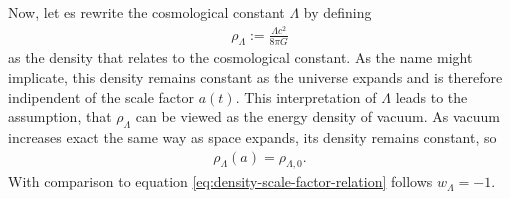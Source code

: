 \noindent Now, let es rewrite the cosmological constant $\Lambda$ by defining
\begin{align}
    \rho_{\Lambda} := \frac{\Lambda c^2}{8\pi G}
\end{align}
as the density that relates to the cosmological constant. As the name might implicate, this density remains constant as the universe expands and is therefore indipendent of the scale factor $a(t)$.
This interpretation of $\Lambda$ leads to the assumption, that $\rho_{\Lambda}$ can be viewed as the energy density of vacuum. As vacuum increases exact the same way as space expands, its density remains constant, so
\begin{align}
    \rho_{\Lambda}(a) = \rho_{\Lambda,0}. \label{eq:lambda-density-scale}
\end{align}
With comparison to equation \eqref{eq:density-scale-factor-relation} follows $w_{\Lambda} = -1$.

